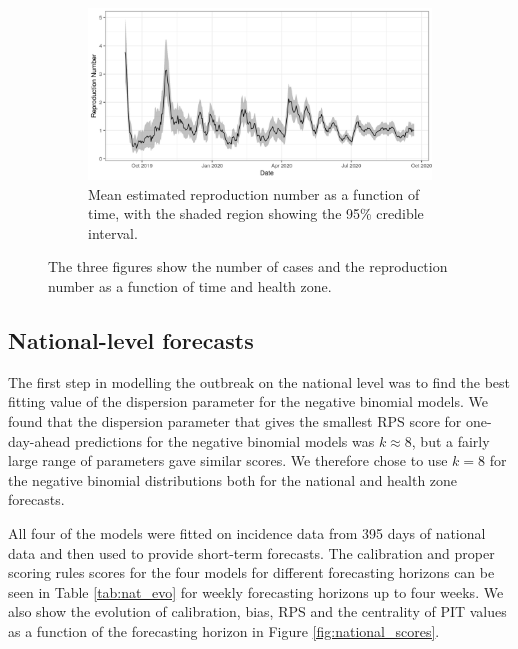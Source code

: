 \documentclass[12pt]{article}
\begin{document}
\begin{figure}[h!]
\bigskip

\begin{subfigure}{\textwidth}
  \centering
  \includegraphics[width=\textwidth]{../output/nat_Rs.png}
  \caption{Mean estimated reproduction number as a function of time, with the shaded region showing the 95\% credible interval.}
  \label{fig:rep_num}
\end{subfigure}
\caption{The three figures show the number of cases and the reproduction number as a function of time and health zone.}
\label{fig:nat_outbreak}
\end{figure}

\subsection{National-level forecasts}
The first step in modelling the outbreak on the national level was to find the best fitting value of the dispersion parameter for the negative binomial models. We found that the dispersion parameter that gives the smallest RPS score for one-day-ahead predictions for the negative binomial models was $k\approx8$, but a fairly large range of parameters gave similar scores. We therefore chose to use $k=8$ for the negative binomial distributions both for the national and health zone forecasts.

All four of the models were fitted on incidence data from 395 days of national data and then used to provide short-term forecasts. The calibration and proper scoring rules scores for the four models for different forecasting horizons can be seen in Table \ref{tab:nat_evo} for weekly forecasting horizons up to four weeks. We also show the evolution of calibration, bias, RPS and the centrality of PIT values as a function of the forecasting horizon in Figure \ref{fig:national_scores}.

\end{document}
